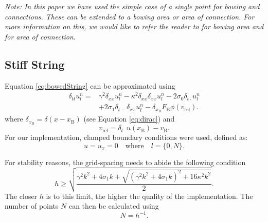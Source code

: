 \documentclass{article}
\begin{document}
\textit{Note: In this paper we have used the simple case of a single point for bowing and connections. These can be extended to a bowing area or area of connection. For more information on this, we would like to refer the reader to \cite{Bilbao2009:NumericalSoundSynthesis} for bowing area and \cite{Bilbao2009:ModularPercussion} for area of connection}.

\subsection{Stiff String}\label{subsec:stiffStringFDS}
Equation \eqref{eq:bowedString} can be approximated using
\begin{equation}
\begin{aligned}\label{eq:bowedStringFDS}
\delta_{tt} u_l^n = &\gamma^2 \delta_{xx} u_l^n -\kappa^2\delta_{xx}\delta_{xx} u_l^n - 2\sigma_0\delta_{t\cdot} u_l^n  \\
&+ 2\sigma_1\delta_{t-}\delta_{xx}u_l^n - \delta_{x_\text{B}}F_\text{B}\phi(v_\text{rel}).
\end{aligned}
\end{equation}
where $\delta_{x_\text{B}} = \delta(x-x_\text{B})$ (see Equation \eqref{eq:dirac}) and 
\begin{equation}\label{eq:descreteRelativeVel}
    v_\text{rel} = \delta_{t\cdot}u(x_\text{B})-v_\text{B}.
\end{equation}
For our implementation, clamped boundary conditions were used, defined as:
\begin{equation}\label{boundary}
    u = u_x = 0 \quad \text{where} \quad l = \{0, N\}.
\end{equation}
  
For stability reasons, the grid-spacing needs to abide the following condition
\begin{equation}\label{eq:stabilityString}
    h \geq \sqrt{\frac{\gamma^2 k^2 + 4 \sigma_1 k + \sqrt {(\gamma^2 k^2 + 4 \sigma_1 k)^2 + 16 \kappa^2 k^2}}{2}}.
\end{equation}
The closer $h$ is to this limit, the higher the quality of the implementation. The number of points $N$ can then be calculated using 
\begin{equation}
    N = h^{-1}.
\end{equation}
\end{document}
